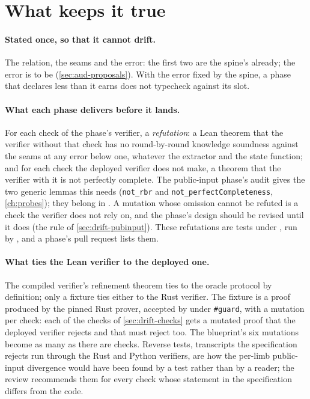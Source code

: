 \section{What keeps it true}\label{sec:drift-mechanisms}

\paragraph{Stated once, so that it cannot drift.} The relation, the seams and the error: the
first two are the spine's already; the error is to be (\cref{sec:aud-proposals}). With the
error fixed by the spine, a phase that declares less than it earns does not typecheck against
its slot.

\paragraph{What each phase delivers before it lands.} For each check of the phase's verifier,
a \emph{refutation}: a Lean theorem that the verifier without that check has no round-by-round
knowledge soundness against the seams at any error below one, whatever the extractor and the
state function; and for each check the deployed verifier does not make, a theorem that the
verifier with it is not perfectly complete. The public-input phase's audit gives the two
generic lemmas this needs (\texttt{not\_rbr} and \texttt{not\_perfectCompleteness},
\cref{ch:probes}); they belong in . A mutation whose omission cannot be
refuted is a check the verifier does not rely on, and the phase's design should be revised
until it does (the rule of \cref{sec:drift-pubinput}). These refutations are tests under
, run by , and a phase's pull request lists them.

\paragraph{What ties the Lean verifier to the deployed one.} The compiled verifier's refinement
theorem ties  to the oracle protocol by definition; only a fixture ties either to
the Rust verifier. The fixture is a proof produced by the pinned Rust prover, accepted by 
under \texttt{\#guard}, with a mutation per check: each of the checks of \cref{sec:drift-checks}
gets a mutated proof that the deployed verifier rejects and that  must reject too.
The blueprint's six mutations become as many as there are checks. Reverse tests, transcripts
the specification rejects run through the Rust and Python verifiers, are how the per-limb
public-input divergence would have been found by a test rather than by a reader; the review
recommends them for every check whose statement in the specification differs from the code.

